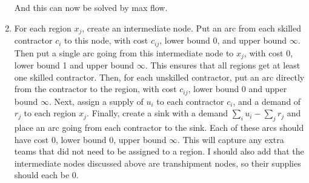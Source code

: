 \documentclass[12pt]{article}
\begin{document}
\begin{enumerate}
\begin{center}
        \end{center}

        And this can now be solved by max flow.\\
    \item
        For each region $x_j$, create an intermediate node. Put an arc from
        each skilled contractor $c_i$ to this node, with cost $c_{ij}$, lower
        bound 0, and upper bound $\infty$. Then put a single arc going from
        this intermediate node to $x_j$, with cost 0, lower bound 1 and upper
        bound $\infty$. This ensures that all regions get at least one skilled
        contractor. Then, for each unskilled contractor, put an arc directly
        from the contractor to the region, with cost $c_{ij}$, lower bound 0
        and upper bound $\infty$. Next, assign a supply of $u_i$ to each
        contractor $c_i$, and a demand of $r_j$ to each region $x_j$. Finally,
        create a sink with a demand $\sum_{i}u_i - \sum_jr_j$ and place an arc
        going from each contractor to the sink. Each of these arcs should have
        cost 0, lower bound 0, upper bound $\infty$. This will capture any
        extra teams that did not need to be assigned to a region. I should also
        add that the intermediate nodes discussed above are transhipment nodes,
        so their supplies should each be 0.


\end{enumerate}
\end{document}
